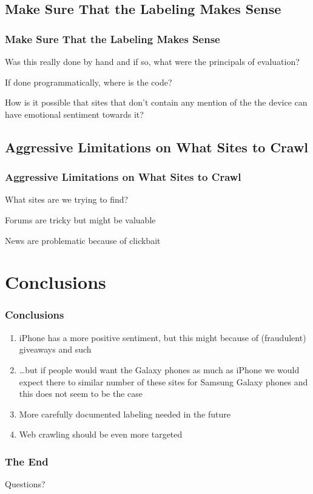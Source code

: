 \documentclass[10pt]{beamer}
\begin{document}
\subsection{Make Sure That the Labeling Makes Sense}

\begin{frame}
\frametitle{Make Sure That the Labeling Makes Sense}

Was this really done by hand and if so, what were the principals
of evaluation?

If done programmatically, where is the code?

How is it possible that sites that don't contain any mention of the the device can have
emotional sentiment towards it?

\end{frame}

\subsection{Aggressive Limitations on What Sites to Crawl}

\begin{frame}
\frametitle{Aggressive Limitations on What Sites to Crawl}

What sites are we trying to find?

Forums are tricky but might be valuable

News are problematic because of clickbait

\end{frame}

\section{Conclusions}

\begin{frame}
\frametitle{Conclusions}

\begin{enumerate}
    \item iPhone has a more positive sentiment, but this might because of (fraudulent) giveaways and such
    \item \ldots but if people would want the Galaxy phones as much as iPhone we would expect there to similar
    number of these sites for Samsung Galaxy phones and this does not seem to be the case
    \item More carefully documented labeling needed in the future
    \item Web crawling should be even more targeted
\end{enumerate}

\end{frame}

\begin{frame}
\frametitle{The End}

\LARGE{\centerline{Questions?}}

\end{frame}

\end{document}
